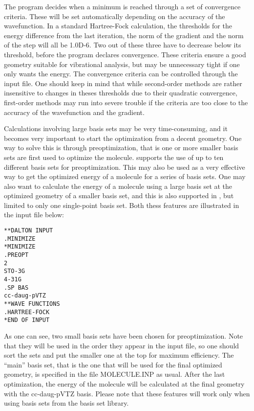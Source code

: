 The program decides when a minimum is reached through a set of
convergence criteria. These will be set automatically depending on the
accuracy of the wavefunction. In a standard Hartree-Fock calculation, the
thresholds for the energy difference from the last iteration, the norm
of the gradient and the norm of the step will all be 1.0D-6. Two out
of these three have to decrease below its threshold, before the program
declares convergence. These criteria ensure a good geometry suitable
for vibrational analysis, but may be unnecessary tight if one only
wants the energy. The convergence criteria can be controlled through
the input file. One should keep in mind that while second-order
methods are rather insensitive to changes in theses thresholds due to
their quadratic convergence, first-order methods may run into severe
trouble if the criteria are too close to the accuracy of the wavefunction
and the gradient.

Calculations involving large basis sets may be very time-consuming,
and it becomes very important to start the optimization from a decent
geometry. One way to solve this is through preoptimization, that is
one or more smaller basis sets are first used to optimize the
molecule. {\siraba} supports the use of up to ten different basis sets
for preoptimization. This may also be used as a very effective way to
get the optimized energy of a molecule for a series of basis
sets. One may also want to calculate the energy of a molecule using a
large basis set at the optimized geometry of a smaller basis set, and
this is also supported in {\siraba}, but limited to only one single-point
basis set. Both thess features are illustrated in the input file below:

\begin{verbatim}
**DALTON INPUT
.MINIMIZE
*MINIMIZE
.PREOPT
2
STO-3G
4-31G
.SP BAS
cc-daug-pVTZ
**WAVE FUNCTIONS
.HARTREE-FOCK
*END OF INPUT
\end{verbatim}

As one can see, two small basis sets have been chosen for
preoptimization. Note that they will be used in the order they appear
in the input file, so one should sort the sets and put the smaller one
at the top for maximum efficiency. The ``main'' basis set, that is the
one that will be used for the final optimized geometry, is specified
in the file MOLECULE.INP as usual. After the last optimization, the
energy of the molecule will be calculated at the final geometry with the
cc-daug-pVTZ basis. Please note that these features will work only
when using basis sets from the basis set library.


